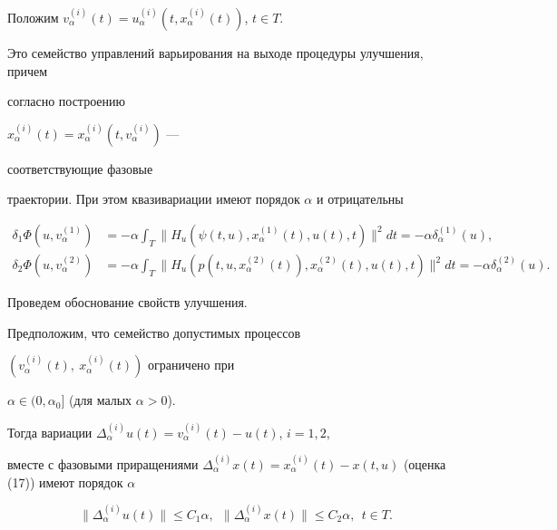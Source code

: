 Положим $v_{\alpha}^{(i)}(t)=u_{\alpha}^{(i)}(t,


x_{\alpha}^{(i)}(t))$, $t\in T$.


Это семейство управлений варьирования на выходе процедуры улучшения, причем


согласно построению


$x_{\alpha}^{(i)}(t)=x_{\alpha}^{(i)}(t, v_{\alpha}^{(i)})$ ---


соответствующие фазовые


траектории. При этом квазивариации имеют порядок $\alpha$ и отрицательны


\begin{align*}


\delta_{1}\Phi(u,v_{\alpha}^{(1)}) &=


- \alpha \int_{T} \|H_{u}(\psi(t,u),


x_{\alpha}^{(1)}(t), u(t), t)\|^{2}dt=-\alpha \delta_{\alpha}^{(1)}(u),\\


%


\delta_{2}\Phi(u,v_{\alpha}^{(2)}) &=


-\alpha \int_{T} \|H_{u}(p(t,u,x_{\alpha}^{(2)}(t)),


x_{\alpha}^{(2)}(t), u(t), t)\|^{2}dt=-\alpha \delta_{\alpha}^{(2)}(u).


\end{align*}





Проведем обоснование свойств улучшения.





Предположим, что семейство допустимых процессов


$(v_{\alpha}^{(i)}(t),\ x_{\alpha}^{(i)}(t))$ ограничено при


$\alpha \in(0, \alpha_{0}]$ (для малых $\alpha>0$).


Тогда вариации $\Delta_{\alpha}^{(i)}u(t)=


v_{\alpha}^{(i)}(t) - u(t)$, $i=1, 2$,


вместе с фазовыми приращениями $\Delta_{\alpha}^{(i)}x(t)=


x_{\alpha}^{(i)}(t) - x(t,u)$ (оценка (17)) имеют порядок $\alpha$


\begin{equation}


\|\Delta_{\alpha}^{(i)}u(t)\| \leq C_{1}\alpha,


\ \ \|\Delta_{\alpha}^{(i)}x(t)\| \leq C_{2}\alpha,\ \ t\in T.


\end{equation}


